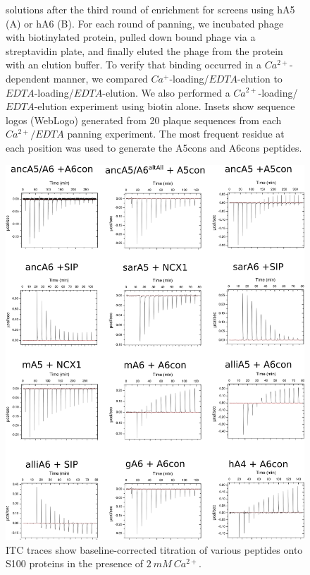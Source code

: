 \begin{figure}
{solutions after the third round of enrichment for screens using hA5
(A) or hA6 (B). For each round of panning, we incubated phage with
biotinylated protein, pulled down bound phage via a streptavidin plate,
and finally eluted the phage from the protein with an elution buffer.
To verify that binding occurred in a $Ca^{2+}$-dependent manner,
we compared $Ca^{+}$-loading/$EDTA$-elution to $EDTA$-loading/$EDTA$-elution.
We also performed a $Ca^{2+}$-loading/$EDTA$-elution experiment
using biotin alone. Insets show sequence logos (WebLogo) generated
from 20 plaque sequences from each $Ca^{2+}/EDTA$ panning experiment.
The most frequent residue at each position was used to generate the
A5cons and A6cons peptides.\label{samplefigure}}	
\end{figure}


\begin{figure}
\centering
	\includegraphics{ch5-figS2.png} 
\caption[Representative raw ITC data traces for each protein]{ITC traces show baseline-corrected titration of various
peptides onto S100 proteins in the presence of $2\ mM\ Ca^{2+}$.
}
\end{figure}
